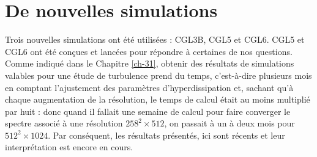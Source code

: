 \section{De nouvelles simulations}\label{sec-333}

Trois nouvelles simulations ont été utilisées : CGL3B, CGL5 et CGL6. CGL5 et CGL6 ont été conçues et lancées pour répondre à certaines de nos questions. Comme indiqué dans le Chapitre \ref{ch-31}, obtenir des résultats de simulations valables pour une étude de turbulence prend du temps, c'est-à-dire plusieurs mois en comptant l'ajustement des paramètres d'hyperdissipation et, sachant qu'à chaque augmentation de la résolution, le temps de calcul était au moins multiplié par huit : donc quand il fallait une semaine de calcul pour faire converger le spectre associé à une résolution $258^2\times 512$, on passait à un à deux mois pour $512^2 \times 1024$. Par conséquent, les résultats présentés, ici sont récents et leur interprétation est encore en cours. 

